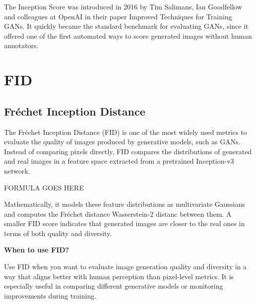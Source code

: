 \thispagestyle{customstyle}

{The Inception Score was introduced in 2016 by Tim Salimans, Ian Goodfellow and colleagues at OpenAI in their paper Improved Techniques
for Training GANs. It quickly became the standard benchmark for evaluating GANs, since it offered one of the first automated ways to score
generated images without human annotators.}

\clearpage
\thispagestyle{genaistyle}
\section{FID}
\subsection{Fréchet Inception Distance}


The Fréchet Inception Distance (FID) is one of the most widely used metrics to evaluate the quality of images produced by generative models,
such as GANs. Instead of comparing pixels directly, FID compares the distributions of generated and real images in a feature space extracted
from a pretrained Inception-v3 network.

\begin{center}
    FORMULA GOES HERE
\end{center}

Mathematically, it models these feature distributions as multivariate Gaussians and computes the Fréchet distance Wasserstein-2 distanc between them.
A smaller FID score indicates that generated images are closer to the real ones in terms of both quality and diversity.

\textbf{When to use FID?}

Use FID when you want to evaluate image generation quality and diversity in a way that aligns better with human perception than pixel-level metrics.
It is especially useful in comparing different generative models or monitoring improvements during training.

